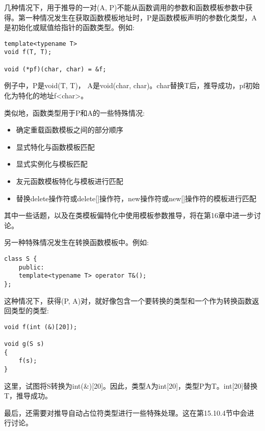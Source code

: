 几种情况下，用于推导的一对(A, P)不能从函数调用的参数和函数模板参数中获得。第一种情况发生在获取函数模板地址时，P是函数模板声明的参数化类型，A是初始化或赋值给指针的函数类型。例如:

\begin{lstlisting}[style=styleCXX]
template<typename T>
void f(T, T);

void (*pf)(char, char) = &f;
\end{lstlisting}

例子中，P是void(T, T)， A是void(char, char)。char替换T后，推导成功，pf初始化为特化的地址f<char>。

类似地，函数类型用于P和A的一些特殊情况:

\begin{itemize}
\item 
确定重载函数模板之间的部分顺序

\item 
显式特化与函数模板匹配

\item 
显式实例化与模板匹配

\item 
友元函数模板特化与模板进行匹配

\item 
替换delete操作符或delete[]操作符，new操作符或new[]操作符的模板进行匹配
\end{itemize}

其中一些话题，以及在类模板偏特化中使用模板参数推导，将在第16章中进一步讨论。

另一种特殊情况发生在转换函数模板中。例如:

\begin{lstlisting}[style=styleCXX]
class S {
	public:
	template<typename T> operator T&();
};
\end{lstlisting}

这种情况下，获得(P, A)对，就好像包含一个要转换的类型和一个作为转换函数返回类型的类型:

\begin{lstlisting}[style=styleCXX]
void f(int (&)[20]);

void g(S s)
{
	f(s);
}
\end{lstlisting}

这里，试图将S转换为int(\&)[20]。因此，类型A为int[20]，类型P为T。int[20]替换T，推导成功。

最后，还需要对推导自动占位符类型进行一些特殊处理。这在第15.10.4节中会进行讨论。


































